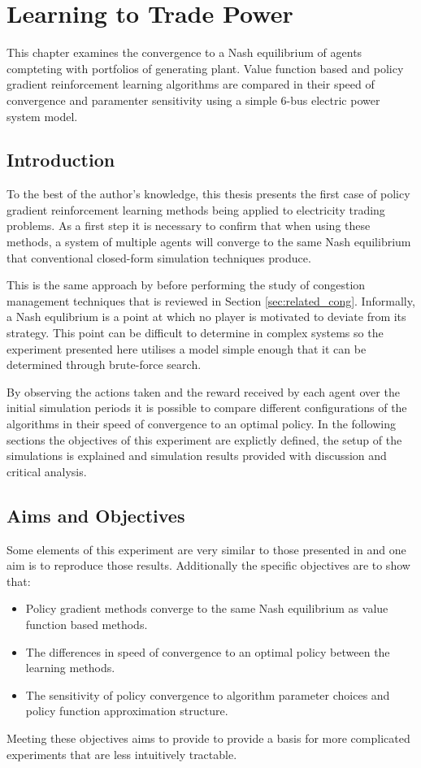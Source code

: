 \chapter{Learning to Trade Power}
\label{ch:learningtotrade}
This chapter examines the convergence to a Nash equilibrium of agents
compteting with portfolios of generating plant.  Value function based and
policy gradient reinforcement learning algorithms are compared in their speed
of convergence and paramenter sensitivity using a simple 6-bus electric power
system model.

\section{Introduction}
To the best of the author's knowledge, this thesis presents the first case of
policy gradient reinforcement learning methods being applied to electricity
trading problems.  As a first step it is necessary to confirm that when using
these methods, a system of multiple agents will converge to the same Nash
equilibrium that conventional closed-form simulation techniques produce.

This is the same approach by  before performing the study
of congestion management techniques that is reviewed in Section
\ref{sec:related_cong}.  Informally, a Nash equlibrium is a point at which no
player is motivated to deviate from its strategy.  This point can be difficult
to determine in complex systems so the experiment presented here utilises a
model simple enough that it can be determined through brute-force search.

By observing the actions taken and the reward received by each agent over the
initial simulation periods it is possible to compare different configurations
of the algorithms in their speed of convergence to an optimal policy.  In the
following sections the objectives of this experiment are explictly defined, the
setup of the simulations is explained and simulation results provided with
discussion and critical analysis.

\section{Aims and Objectives}
Some elements of this experiment are very similar to those presented in
 and one aim is to reproduce those results.  Additionally
the specific objectives are to show that:
\begin{itemize}
  \item Policy gradient methods converge to the same Nash equilibrium as value
  function based methods.
  \item The differences in speed of convergence to an optimal policy between
  the learning methods.
  \item The sensitivity of policy convergence to algorithm parameter choices
  and policy function approximation structure.
\end{itemize}
Meeting these objectives aims to provide to provide a basis for more
complicated experiments that are less intuitively tractable.

